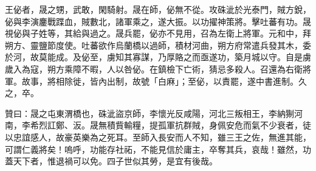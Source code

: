 \begin{pinyinscope}
 王佖者，晟之甥，武敢，閑騎射。晟在師，佖無不從。攻硃泚於光泰門，賊方銳，佖與李演鏖戰蹀血，賊數北，諸軍乘之，遂大振。以功擢神策將。擊吐蕃有功。晟視佖與子姓等，其給與過之。晟兵罷，佖亦不見用，召為左衛上將軍。元和中，拜朔方、靈鹽節度使。吐蕃欲作烏蘭橋以過師，積材河曲，朔方府常遣兵發其木，委於河，故莫能成。及佖至，虜知其寡謀，乃厚賂之而亟遂功，築月城以守。自是虜歲入為寇，朔方乘障不暇，人以咎佖。在鎮檢下亡術，猜忌多殺人。召還為右衛將軍。故事，將相除徙，皆內出制，故號「白麻」；至佖，以責罷，遂中書進制。久之，卒。



 贊曰：晟之屯東渭橋也，硃泚盜京師，李懷光反咸陽，河北三叛相王，李納猘河南，李希烈訌鄭、汳。晟無積貲輸糧，提孤軍抗群賊，身佩安危而氣不少衰者，徒以忠誼感人，故豪英樂為之死耳。至師入長安而人不知，雖三王之佐，無進其能，可謂仁義將矣！嗚呼，功能存社祏，不能見信於庸主，卒奪其兵，哀哉！雖然，功蓋天下者，惟退禍可以免。四子世似其勞，是宜有後哉。



\end{pinyinscope}